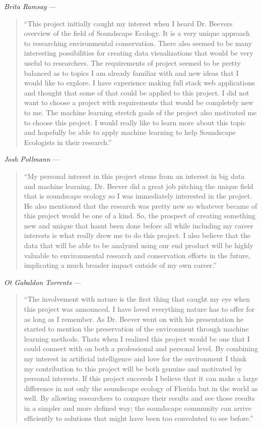 \noindent\textit{Brita Ramsay} ---
\begin{quote}
``This project initially caught my interest when I heard Dr. Beever\textquotesingle s overview of the field of Soundscape Ecology. It is a very unique approach to researching environmental conservation. There also seemed to be many interesting possibilities for creating data visualizations that would be very useful to researchers. The requirements of project seemed to be pretty balanced as to topics I am already familiar with and new ideas that I would like to explore. I have experience making full stack web applications and thought that some of that could be applied to this project. I did not want to choose a project with requirements that would be completely new to me. The machine learning stretch goals of the project also motivated me to choose this project. I would really like to learn more about this topic and hopefully be able to apply machine learning to help Soundscape Ecologists in their research.''
\end{quote}

\noindent\textit{Josh Pollmann} ---
\begin{quote}
``My personal interest in this project stems from an interest in big data and machine learning. Dr. Beever did a great job pitching the unique field that is soundscape ecology so I was immediately interested in the project. He also mentioned that the research was pretty new so whatever became of this project would be one of a kind. So, the prospect of creating something new and unique that hasn\textquotesingle t been done before all while including my career interests is what really drew me to do this project. I also believe that the data that will be able to be analyzed using our end product will be highly valuable to environmental research and conservation efforts in the future, implicating a much broader impact outside of my own career.''
\end{quote}

\noindent\textit{Ot Gabaldon Torrents} ---
\begin{quote}
``The involvement with nature is the first thing that caught my eye when this project was announced. I have loved everything nature has to offer for as long as I remember. As Dr. Beever went on with his presentation he started to mention the preservation of the environment through machine learning methods. That\textquotesingle s when I realized this project would be one that I could connect with on both a professional and personal level. By combining my interest in artificial intelligence and love for the environment I think my contribution to this project will be both genuine and motivated by personal interests. If this project succeeds I believe that it can make a large difference in not only the soundscape ecology of Florida but in the world as well. By allowing researchers to compare their results and see those results in a simpler and more defined way; the soundscape community can arrive efficiently to solutions that might have been too convoluted to see before.''
\end{quote}
